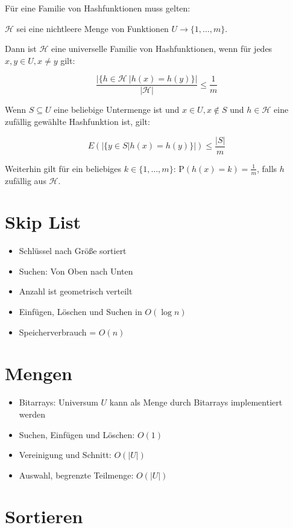 \documentclass[11pt]{scrartcl}
\begin{document}
Für eine Familie von Hashfunktionen muss gelten:

$\mathcal{H}$ sei eine nichtleere Menge von Funktionen $U \to \{1, \ldots, m\}$.

Dann ist $\mathcal{H}$ eine universelle Familie von Hashfunktionen, wenn für jedes $x,y \in U, x \neq y$ gilt:

$$\frac{|\{ h \in \mathcal{H}\ | h(x) = h(y) \}|}{|\mathcal{H}|} \leq \frac{1}{m}$$

Wenn $S \subseteq U$ eine beliebige Untermenge ist und $x \in U, x \notin S$ und $h \in \mathcal{H}$ eine zufällig gewählte Hashfunktion ist, gilt:

$$E(|\{ y \in S | h(x) = h(y) \}|) \leq \frac{|S|}{m}$$

Weiterhin gilt für ein beliebiges $k \in \{1, \ldots, m\}$: $\textrm{P}(h(x) = k) = \frac{1}{m}$, falls $h$ zufällig aus $\mathcal{H}$.

\section{Skip List}
\begin{itemize}
	\item Schlüssel nach Größe sortiert
    \item Suchen: Von Oben nach Unten
    \item Anzahl ist geometrisch verteilt
    \item Einfügen, Löschen und Suchen in $O(\log n)$
    \item Speicherverbrauch = $O(n)$
\end{itemize}

\section{Mengen}
\begin{itemize}
	\item Bitarrays: Universum $U$ kann als Menge durch Bitarrays implementiert werden
    \item Suchen, Einfügen und Löschen: $O(1)$
    \item Vereinigung und Schnitt: $O(|U|)$
    \item Auswahl, begrenzte Teilmenge: $O(|U|)$
\end{itemize}


\section{Sortieren}
\end{document}
